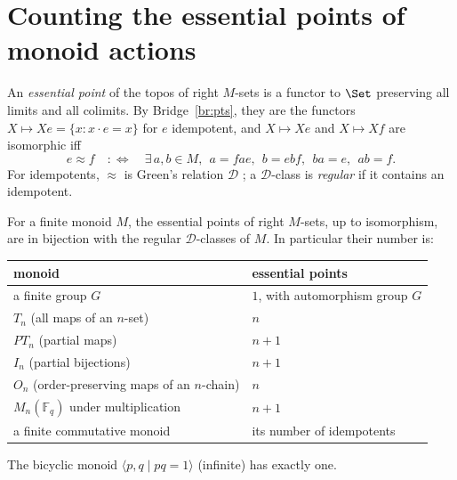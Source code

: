 \section{Counting the essential points of monoid actions}\label{sec:fibre}

An \emph{essential point} of the topos of right $M$-sets is a functor to $\Set$ preserving all limits and all colimits. By Bridge~\ref{br:pts}, they are the functors $X\mapsto Xe = \{x : x\cdot e = x\}$ for $e$ idempotent, and $X\mapsto Xe$ and $X\mapsto Xf$ are isomorphic iff
\[
e\approx f\quad:\iff\quad\exists\, a,b\in M,\ \ a = fae,\ \ b = ebf,\ \ ba = e,\ \ ab = f.
\]
For idempotents, $\approx$ is Green's relation $\mathcal D$ \cite[Prop.~3.1]{costa-steinberg}; a $\mathcal D$-class is \emph{regular} if it contains an idempotent.

\begin{theorem}\label{th:fibre}
For a finite monoid $M$, the essential points of right $M$-sets, up to isomorphism, are in bijection with the regular $\mathcal D$-classes of $M$. In particular their number is:
\begin{center}\small
\begin{tabular}{ll}
\toprule
monoid & essential points\\
\midrule
a finite group $G$ & $1$, with automorphism group $G$\\
$T_n$ (all maps of an $n$-set) & $n$\\
$PT_n$ (partial maps) & $n+1$\\
$I_n$ (partial bijections) & $n+1$\\
$O_n$ (order-preserving maps of an $n$-chain) & $n$\\
$M_n(\mathbb F_q)$ under multiplication & $n+1$\\
a finite commutative monoid & its number of idempotents\\
\bottomrule
\end{tabular}
\end{center}
The bicyclic monoid $\langle p,q\mid pq = 1\rangle$ (infinite) has exactly one.
\end{theorem}


